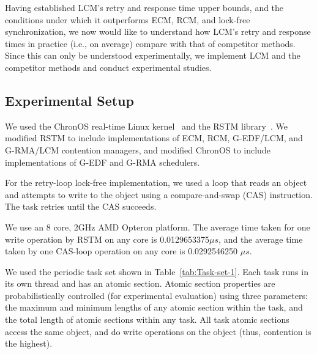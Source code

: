 \documentclass{sig-alternate}
\begin{document}
Having established LCM's retry and response time upper bounds, and the conditions under which it outperforms ECM, RCM, and lock-free synchronization, we now would like to understand how LCM's retry and response times in practice (i.e., on average) compare with that of competitor methods. Since this can only be understood experimentally, we implement LCM and the competitor methods and conduct experimental studies. 

\subsection{Experimental Setup}
We used the ChronOS real-time Linux kernel~\cite{dellinger2011chronos}
and the RSTM library~\cite{marathe2006lowering}. We modified RSTM to include implementations of ECM, RCM, G-EDF/LCM, and G-RMA/LCM contention managers, and modified ChronOS to include implementations of G-EDF and G-RMA schedulers. 

For the retry-loop lock-free implementation,
we used a loop that reads an object and attempts to write to the object using a compare-and-swap (CAS) instruction. The task retries until the CAS succeeds. 

We use an 8 core, 2GHz AMD Opteron platform. The average time
taken for one write operation by RSTM on any
core is 0.0129653375$\mu s$, and the average time taken
by one CAS-loop operation on any core is 0.0292546250 $\mu s$.

We used the periodic task set shown in Table~\ref{tab:Task-set-1}. Each task runs in its own thread and has an atomic section. Atomic section properties are probabilistically controlled (for experimental evaluation) using three parameters: the maximum and minimum lengths of any atomic section within the task, and the total length of atomic sections within any task. All task atomic sections access the same object, and do write operations on the object (thus, contention is the highest).
\end{document}
